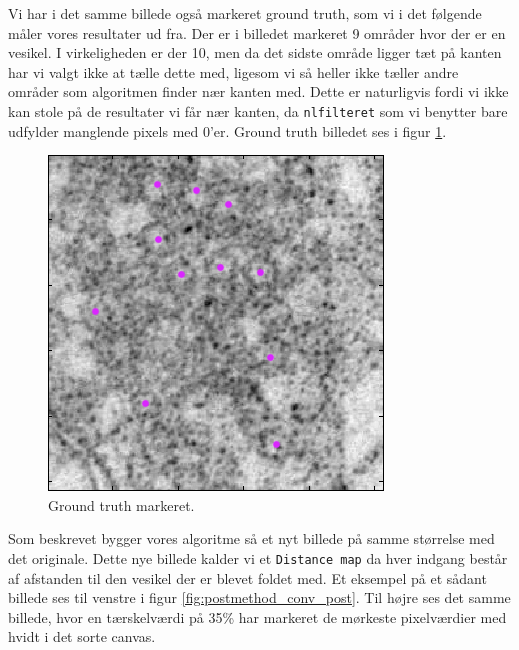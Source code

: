Vi har i det samme billede også markeret ground truth, som vi i det følgende måler vores resultater ud fra. Der er i billedet markeret 9 områder hvor der er en vesikel. I virkeligheden er der 10, men da det sidste område ligger tæt på kanten har vi valgt ikke at tælle dette med, ligesom vi så heller ikke tæller andre områder som algoritmen finder nær kanten med. Dette er naturligvis fordi vi ikke kan stole på de resultater vi får nær kanten, da \texttt{nlfilteret} som vi benytter bare udfylder manglende pixels med 0'er. Ground truth billedet ses i figur \ref{fig:postmethod_conv_gt}. 

\begin{figure}[H]
		\centering
		\includegraphics[scale=0.65]{files/postmethod/img/ground_truth.png}
	\caption{Ground truth markeret.\label{fig:postmethod_conv_gt}}
\end{figure}

Som beskrevet bygger vores algoritme så et nyt billede på samme størrelse med det originale. Dette nye billede kalder vi et \texttt{Distance map} da hver indgang består af afstanden til den vesikel der er blevet foldet med. Et eksempel på et sådant billede ses til venstre i figur \ref{fig:postmethod_conv_post}. Til højre ses det samme billede, hvor en tærskelværdi på 35\% har markeret de mørkeste pixelværdier med hvidt i det sorte canvas.


